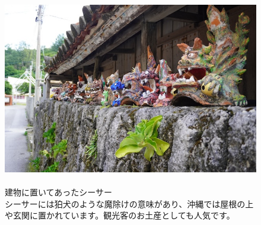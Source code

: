 \documentclass[../main]{subfiles}
\begin{document}
\begin{figure}[H]
  \begin{minipage}[b]{0.48\columnwidth}
    \caption{\\
    建物に置いてあったシーサー\\
    シーサーには狛犬のような魔除けの意味があり、沖縄では屋根の上や玄関に置かれています。観光客のお土産としても人気です。
    }
  \end{minipage}
  \hspace{0.04\columnwidth} %
  \begin{minipage}[b]{0.48\columnwidth}
    \centering
    \includegraphics[width=\columnwidth]{figure/zamami_si-sa-.jpg}
  \end{minipage}
\end{figure}
\end{document}
